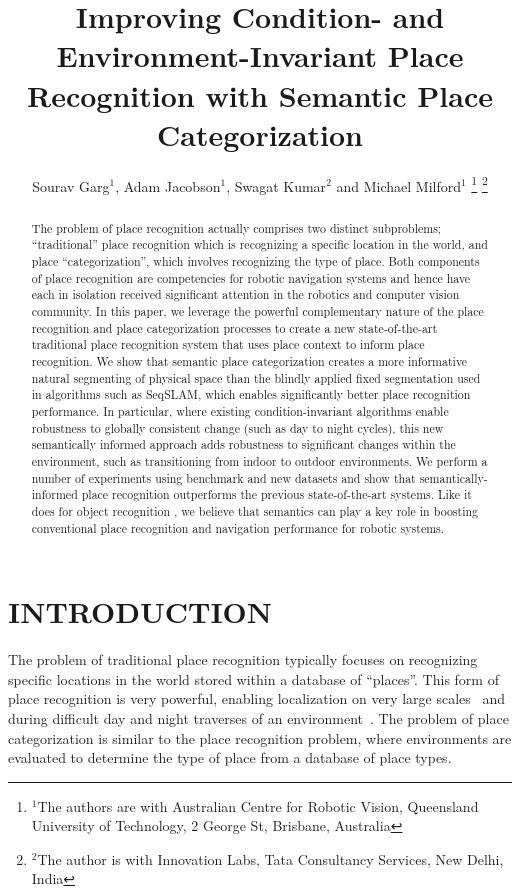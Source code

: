 \documentclass[letterpaper, 10 pt, conference]{ieeeconf}  %
\title{\LARGE \bf
Improving Condition- and Environment-Invariant Place Recognition with Semantic Place Categorization
}
\author{Sourav Garg$^{1}$, Adam Jacobson$^{1}$, Swagat Kumar$^{2}$ and Michael Milford$^{1}$%
\thanks{$^{1}$The authors are with Australian Centre for Robotic Vision,
        Queensland University of Technology,
        2 George St, Brisbane, Australia}%
\thanks{$^{2}$The author is with Innovation Labs, Tata Consultancy Services,
        New Delhi, India}%
}
\begin{document}
\maketitle
\thispagestyle{empty}
\pagestyle{empty}


\begin{abstract}
The problem of place recognition actually comprises two distinct subproblems; ``traditional'' place recognition which is recognizing a specific location in the world, and place ``categorization'', which involves recognizing the type of place. Both components of place recognition are competencies for robotic navigation systems and hence have each in isolation received significant attention in the robotics and computer vision community. In this paper, we leverage the powerful complementary nature of the place recognition and place categorization processes to create a new state-of-the-art traditional place recognition system that uses place context to inform place recognition. We show that semantic place categorization creates a more informative natural segmenting of physical space than the blindly applied fixed segmentation used in algorithms such as SeqSLAM, which enables significantly better place recognition performance. In particular, where existing condition-invariant algorithms enable robustness to globally consistent change (such as day to night cycles), this new semantically informed approach adds robustness to significant changes within the environment, such as transitioning from indoor to outdoor environments. We perform a number of experiments using benchmark and new datasets and show that semantically-informed place recognition outperforms the previous state-of-the-art systems. Like it does for object recognition \cite{sunderhauf2016place}, we believe that  semantics can play a key role in boosting conventional place recognition and navigation performance for robotic systems.
\end{abstract}

\section{INTRODUCTION}


The problem of traditional place recognition typically focuses on recognizing specific locations in the world stored within a database of ``places''. This form of place recognition is very powerful, enabling localization on very large scales~\cite{Cummins2009} and during difficult day and night traverses of an environment~\cite{Milford2012}. The problem of place categorization is similar to the place recognition problem, where environments are evaluated to determine the type of place from a database of place types. 
\end{document}
